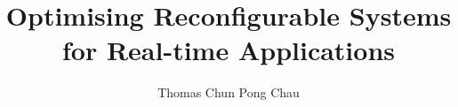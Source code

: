 \documentclass[a4paper,12pt,twoside]{report}
\begin{document}
\title{\LARGE {\bf Optimising Reconfigurable Systems for Real-time Applications}\\
 \vspace*{6mm}
}

\author{Thomas Chun Pong Chau}

\normallinespacing
\maketitle

\preface






%


\body









\appendix

\cleardoublepage
{}
{}
\renewcommand{\bibname}{Bibliography}


\end{document}
